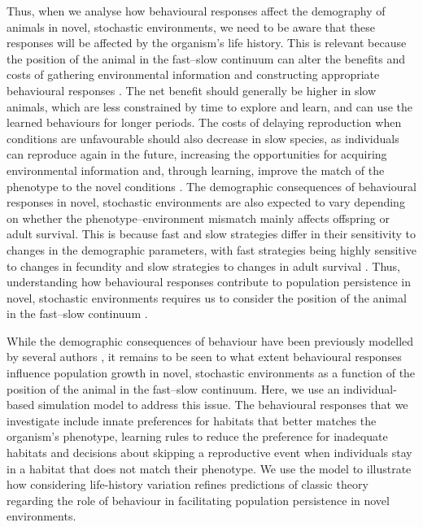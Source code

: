 Thus, when we analyse how behavioural responses affect
the demography of animals in novel, stochastic environments,
we need to be aware that these responses will be affected by the
organism’s life history. This is relevant because the position of
the animal in the fast–slow continuum can alter the benefits
and costs of gathering environmental information and constructing
appropriate behavioural responses \citep{Forcada2008, Saether2000,
Lewontin1969, Saether2005a, Starrfelt2012}. The net
benefit should generally be higher in slow animals, which are
less constrained by time to explore and learn, and can use the
learned behaviours for longer periods. The costs of delaying
reproduction when conditions are unfavourable should also
decrease in slow species, as individuals can reproduce again
in the future, increasing the opportunities for acquiring
environmental information and, through learning, improve
the match of the phenotype to the novel conditions \citep{Sol2012a}.
The demographic consequences of behavioural responses in
novel, stochastic environments are also expected to vary
depending on whether the phenotype–environment mismatch
mainly affects offspring or adult survival. This is because fast
and slow strategies differ in their sensitivity to changes in the
demographic parameters, with fast strategies being highly
sensitive to changes in fecundity and slow strategies to changes
in adult survival \citep{Gaillard2000a}. Thus, understanding how behavioural
responses contribute to population persistence in novel, stochastic
environments requires us to consider the position of
the animal in the fast–slow continuum \citep{Sol2016}.

While the demographic consequences of behaviour have
been previously modelled by several authors \citep{Kokko2001, Cressman2013, Kisdi2002,
kawecki1995demography, Strasser2012}, it
remains to be seen to what extent behavioural responses influence
population growth in novel, stochastic environments as a
function of the position of the animal in the fast–slow continuum.
Here, we use an individual-based simulation model
to address this issue. The behavioural responses that we investigate
include innate preferences for habitats that better
matches the organism’s phenotype, learning rules to reduce
the preference for inadequate habitats and decisions about
skipping a reproductive event when individuals stay in a habitat
that does not match their phenotype. We use the model to
illustrate how considering life-history variation refines predictions
of classic theory regarding the role of behaviour in
facilitating population persistence in novel environments.


